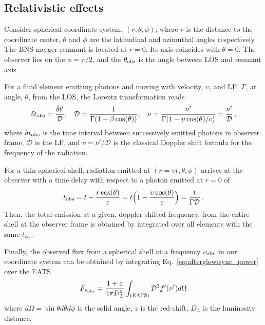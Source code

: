 \subsection{Relativistic effects}

Consider spherical coordinate system, $(r,\theta,\phi)$, where 
$r$ is the distance to the coordinate center, $\theta$ and $\phi$ 
are the latitudinal and azimuthal angles respectively. 
The \ac{BNS} merger remnant is located at $r=0$. 
Its axis coincides with $\theta = 0$. 
The observer lies on the $\phi = \pi / 2$, and the $\theta_{\rm obs}$ is 
the angle between \ac{LOS} and remnant axis. 

For a fluid element emitting photons and moving with velocity, 
$\upsilon$, and \ac{LF}, $\Gamma$, at angle, $\theta$, 
from the \ac{LOS}, the Lorentz transformation reads 
%
\begin{equation}
\delta t_{\rm obs} = \frac{\delta t'}{\mathcal{D}}, \hspace{3mm}
\mathcal{D} = \frac{1}{\Gamma(1 - \beta\cos(\theta))}, \hspace{3mm}
\nu = \frac{\nu'}{\Gamma (1 - \upsilon\cos(\theta)/c)} = \frac{\nu'} {\mathcal{D}}\, ,
\label{eq:afterglow:dop_fac}
\end{equation}
%
where $\delta t_{\rm obs}$ is the time interval between successively emitted photons 
in observer frame, $\mathcal{D}$ is the \ac{LF}, and $\nu=\nu'/\mathcal{D}$ is the 
classical Doppler shift formula for the frequency of the radiation.


For a thin spherical shell, radiation emitted at $(r=\upsilon t,\theta,\phi)$ 
arrives at the observer with a time delay with respect to a photon emitted at 
$r=0$ of
%
\begin{equation}
t_{\rm obs} = t - \frac{r \cos(\theta)}{c} = t\Big(1-\frac{\upsilon\cos(\theta)}{c}\Big) = \frac{t}{\Gamma\mathcal{D}}\, .
\label{eq:afterglow:tobs}
\end{equation}
%
Then, the total emission at a given, doppler shifted frequency, from the entire 
shell at the observer frame is obtained by integrated over all elements with the 
same $t_{obs}$.

Finally, the observed flux from a spherical shell at a frequency $\nu_{\rm obs}$ 
in our coordinate system can be obtained by integrating Eq.~\eqref{eq:afterglow:sync_power} over the \ac{EATS} 
\begin{equation}
    F_{\nu_{\rm obs}} = \frac{1+z}{4\pi D_L^2} \int_{\rm (EATS)} \mathcal{D}^3 f'(\nu') d\Omega
    \label{eq:afterglow:sync_power_obs}
\end{equation}
where $d\Omega = \sin\theta d\theta d\phi$ is the solid angle, $z$ is the red-shift, 
$D_L$ is the luminosity distance. 


